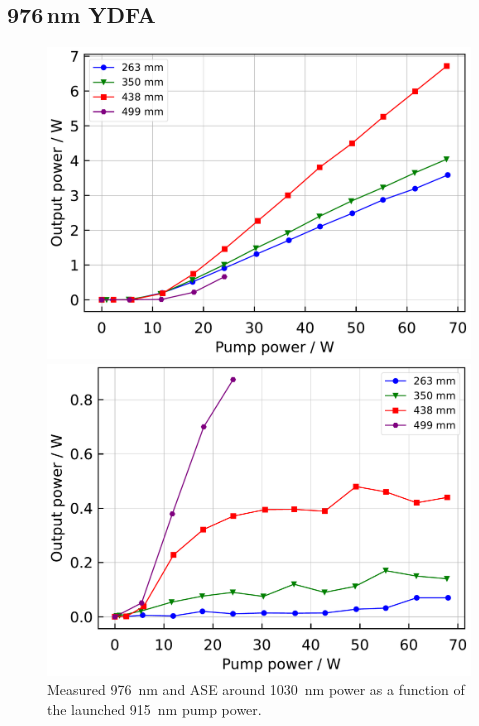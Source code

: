 \documentclass{osa-article}
\begin{document}
\subsection{976\,nm YDFA}

\begin{figure}[h!]
  \begin{minipage}[b]{0.5\linewidth}
    \centering
    \includegraphics[keepaspectratio, width=0.9\linewidth]{./Figure/Yb1200-20-125DC-PM_SignalComparisonByLength_915Pump976Seed_Exp}
    \subcaption{}
  \end{minipage}
  \begin{minipage}[b]{0.5\linewidth}
    \centering
    \includegraphics[keepaspectratio, width=0.9\linewidth]{./Figure/Yb1200-20-125DC-PM_ASEComparisonByLength_915Pump976Seed_Exp}
    \subcaption{}
  \end{minipage}
  \caption{Measured \SI{976}{nm} and ASE around \SI{1030}{nm} power as a function of the launched \SI{915}{nm} pump power.}
  \label{fig:OutputComparisonOfNLIGHT976YDFA}
\end{figure}
\end{document}
